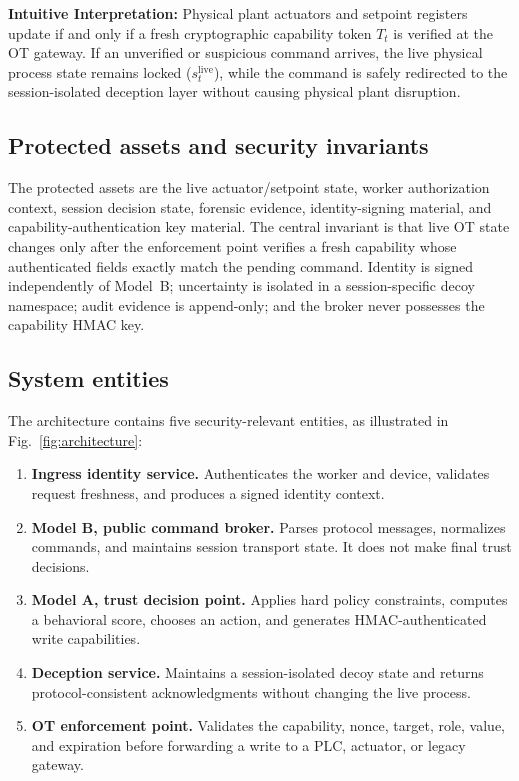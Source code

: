 \documentclass[journal]{IEEEtran}
\begin{document}
\noindent\textbf{Intuitive Interpretation:} Physical plant actuators and setpoint registers update if and only if a fresh cryptographic capability token $T_t$ is verified at the OT gateway. If an unverified or suspicious command arrives, the live physical process state remains locked ($s_t^{\mathrm{live}}$), while the command is safely redirected to the session-isolated deception layer without causing physical plant disruption.

\subsection{Protected assets and security invariants}
The protected assets are the live actuator/setpoint state, worker authorization context, session decision state, forensic evidence, identity-signing material, and capability-authentication key material. The central invariant is that live OT state changes only after the enforcement point verifies a fresh capability whose authenticated fields exactly match the pending command. Identity is signed independently of Model~B; uncertainty is isolated in a session-specific decoy namespace; audit evidence is append-only; and the broker never possesses the capability HMAC key.

\subsection{System entities}
The architecture contains five security-relevant entities, as illustrated in Fig.~\ref{fig:architecture}:
\begin{enumerate}
    \item \textbf{Ingress identity service.} Authenticates the worker and device, validates request freshness, and produces a signed identity context.
    \item \textbf{Model B, public command broker.} Parses protocol messages, normalizes commands, and maintains session transport state. It does not make final trust decisions.
    \item \textbf{Model A, trust decision point.} Applies hard policy constraints, computes a behavioral score, chooses an action, and generates HMAC-authenticated write capabilities.
    \item \textbf{Deception service.} Maintains a session-isolated decoy state and returns protocol-consistent acknowledgments without changing the live process.
    \item \textbf{OT enforcement point.} Validates the capability, nonce, target, role, value, and expiration before forwarding a write to a PLC, actuator, or legacy gateway.
\end{enumerate}
\end{document}
